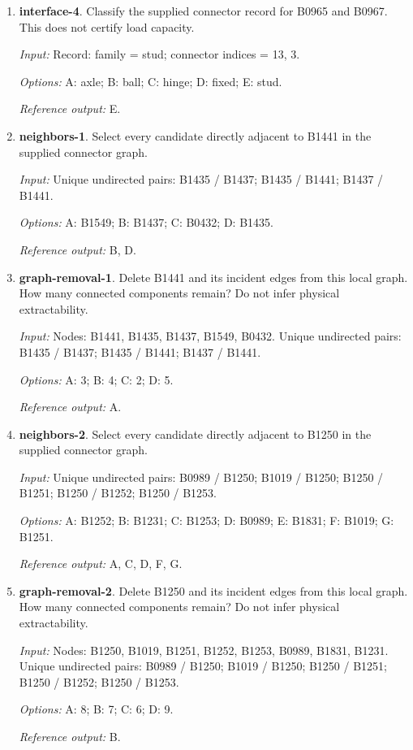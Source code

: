 \begin{enumerate}
\item \textbf{interface-4}. Classify the supplied connector record for B0965 and B0967. This does not certify load capacity.\par {\small \textit{Input:} Record: family = stud; connector indices = 13, 3. \par\textit{Options:} A: axle; B: ball; C: hinge; D: fixed; E: stud. \par\textit{Reference output:} E.}
\item \textbf{neighbors-1}. Select every candidate directly adjacent to B1441 in the supplied connector graph.\par {\small \textit{Input:} Unique undirected pairs: B1435 / B1437; B1435 / B1441; B1437 / B1441. \par\textit{Options:} A: B1549; B: B1437; C: B0432; D: B1435. \par\textit{Reference output:} B, D.}
\item \textbf{graph-removal-1}. Delete B1441 and its incident edges from this local graph. How many connected components remain? Do not infer physical extractability.\par {\small \textit{Input:} Nodes: B1441, B1435, B1437, B1549, B0432. Unique undirected pairs: B1435 / B1437; B1435 / B1441; B1437 / B1441. \par\textit{Options:} A: 3; B: 4; C: 2; D: 5. \par\textit{Reference output:} A.}
\item \textbf{neighbors-2}. Select every candidate directly adjacent to B1250 in the supplied connector graph.\par {\small \textit{Input:} Unique undirected pairs: B0989 / B1250; B1019 / B1250; B1250 / B1251; B1250 / B1252; B1250 / B1253. \par\textit{Options:} A: B1252; B: B1231; C: B1253; D: B0989; E: B1831; F: B1019; G: B1251. \par\textit{Reference output:} A, C, D, F, G.}
\item \textbf{graph-removal-2}. Delete B1250 and its incident edges from this local graph. How many connected components remain? Do not infer physical extractability.\par {\small \textit{Input:} Nodes: B1250, B1019, B1251, B1252, B1253, B0989, B1831, B1231. Unique undirected pairs: B0989 / B1250; B1019 / B1250; B1250 / B1251; B1250 / B1252; B1250 / B1253. \par\textit{Options:} A: 8; B: 7; C: 6; D: 9. \par\textit{Reference output:} B.}

\end{enumerate}
